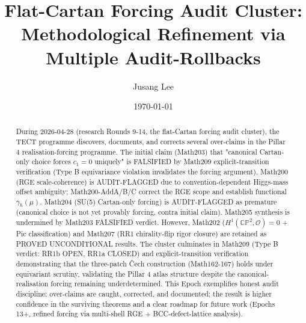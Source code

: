 



\title{Flat-Cartan Forcing Audit Cluster: Methodological Refinement via Multiple
Audit-Rollbacks}

\author{Jusang Lee}

\date{\today}

\begin{abstract}
During 2026-04-28 (research Rounds 9-14, the flat-Cartan forcing audit
cluster), the TECT programme discovers, documents, and corrects several
over-claims in the Pillar 4 realisation-forcing programme. The initial claim
(Math203) that "canonical Cartan-only choice forces $c_1 = 0$ uniquely" is
FALSIFIED by Math209 explicit-transition verification (Type B equivariance
violation invalidates the forcing argument). Math200 (RGE scale-coherence) is
AUDIT-FLAGGED due to convention-dependent Higgs-mass offset ambiguity; Math200-AddA/B/C
correct the RGE scope and establish functional $\gamma_\hbar(\mu)$. Math204 (SU(5) Cartan-only
forcing) is AUDIT-FLAGGED as premature (canonical choice is not yet provably
forcing, contra initial claim). Math205 synthesis is undermined by Math203
FALSIFIED verdict. However, Math202 ($H^1(\mathbb{CP}^2, \mathcal{O}) = 0$ +
Pic classification) and Math207 (RR1 chirality-flip rigor closure) are retained
as PROVED UNCONDITIONAL results. The cluster culminates in Math209 (Type B
verdict: RR1b OPEN, RR1a CLOSED) and explicit-transition verification
demonstrating that the three-patch Čech construction (Math162-167) holds under
equivariant scrutiny, validating the Pillar 4 atlas structure despite the
canonical-realisation forcing remaining underdetermined. This Epoch exemplifies
honest audit discipline: over-claims are caught, corrected, and documented; the
result is higher confidence in the surviving theorems and a clear roadmap for
future work (Epochs 13+, refined forcing via multi-shell RGE + BCC-defect-lattice
analysis).
\end{abstract}

